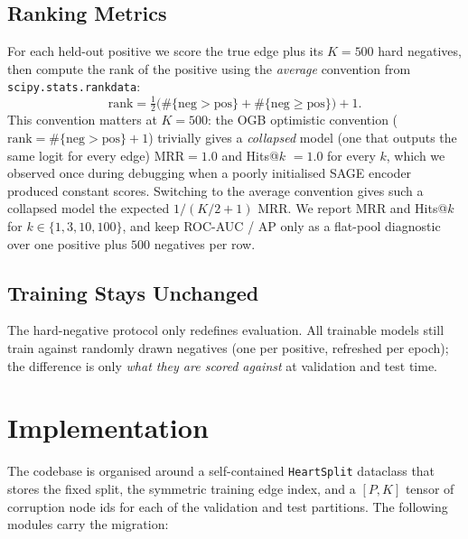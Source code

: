 \documentclass[10pt,a4paper]{article}
\begin{document}
\subsection{Ranking Metrics}
For each held-out positive we score the true edge plus its $K=500$ hard
negatives, then compute the rank of the positive using the
\emph{average} convention from \texttt{scipy.stats.rankdata}:
\[
\mathrm{rank} = \tfrac{1}{2}\bigl(\#\{\text{neg} > \text{pos}\} + \#\{\text{neg} \ge \text{pos}\}\bigr) + 1.
\]
This convention matters at $K=500$: the OGB optimistic convention
($\mathrm{rank} = \#\{\text{neg} > \text{pos}\} + 1$) trivially gives a
\emph{collapsed} model (one that outputs the same logit for every edge)
$\mathrm{MRR}=1.0$ and Hits@$k$ $=1.0$ for every $k$, which we observed
once during debugging when a poorly initialised SAGE encoder produced
constant scores. Switching to the average convention gives such a
collapsed model the expected $1/(K/2 + 1)$ MRR. We report MRR and
Hits@$k$ for $k \in \{1, 3, 10, 100\}$, and keep ROC-AUC / AP only as
a flat-pool diagnostic over one positive plus $500$ negatives per row.

\subsection{Training Stays Unchanged}
The hard-negative protocol only redefines evaluation. All trainable
models still train against randomly drawn negatives (one per positive,
refreshed per epoch); the difference is only \emph{what they are scored
against} at validation and test time.

\section{Implementation}
\label{sec:impl}

The codebase is organised around a self-contained
\texttt{HeartSplit} dataclass that stores the fixed split, the
symmetric training edge index, and a $[P, K]$ tensor of corruption
node ids for each of the validation and test partitions. The
following modules carry the migration:
\end{document}

